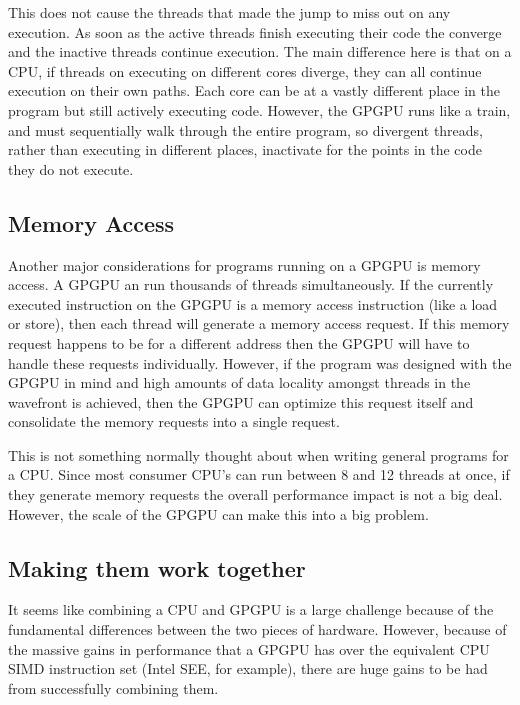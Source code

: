 This does not cause the threads that made the jump to miss out on any execution. As soon as the active threads finish executing their code the converge and the inactive threads continue execution. The main difference here is that on a CPU, if threads on executing on different cores diverge, they can all continue execution on their own paths. Each core can be at a vastly different place in the program but still actively executing code. However, the GPGPU runs like a train, and must sequentially walk through the entire program, so divergent threads, rather than executing in different places, inactivate for the points in the code they do not execute. \cite{memcached}

\subsection*{Memory Access}

Another major considerations for programs running on a GPGPU is memory access. A GPGPU an run thousands of threads simultaneously. If the currently executed instruction on the GPGPU is a memory access instruction (like a load or store), then each thread will generate a memory access request. If this memory request happens to be for a different address then the GPGPU will have to handle these requests individually. However, if the program was designed with the GPGPU in mind and high amounts of data locality amongst threads in the wavefront is achieved, then the GPGPU can optimize this request itself and consolidate the memory requests into a single request.

This is not something normally thought about when writing general programs for a CPU. Since most consumer CPU's can run between 8 and 12 threads at once, if they generate memory requests the overall performance impact is not a big deal. However, the scale of the GPGPU can make this into a big problem. \cite{memcached}



\subsection*{Making them work together}

It seems like combining a CPU and GPGPU is a large challenge because of the fundamental differences between the two pieces of hardware. However, because of the massive gains in performance that a GPGPU has over the equivalent CPU SIMD instruction set (Intel SEE, for example), there are huge gains to be had from successfully combining them. 














